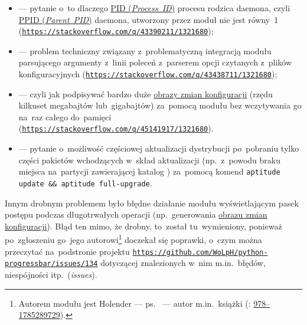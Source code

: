 \documentclass[thesis]{subfiles}
\begin{document}
\begin{itemize}
	\item {} --- pytanie o~to dlaczego \href{https://en.wikipedia.org/wiki/Process_identifier}{PID (\emph{Process~ID})} procesu rodzica daemona, czyli \href{http://wiki.linuxquestions.org/wiki/PPID}{PPID (\emph{Parent~PID})} daemona, utworzony przez moduł  nie jest równy~1 (\texttt{\url{https://stackoverflow.com/q/43390211/1321680}});
	\item {} --- problem techniczny związany z~problematyczną integracją modułu  parsującego argumenty z~linii poleceń z~parserem opcji czytanych z~plików konfiguracyjnych  (\texttt{\url{https://stackoverflow.com/q/43438711/1321680}});
	\item {} --- czyli jak podpisywać bardzo duże \hyperref[sec:obraz-zmian-konfiguracji]{obrazy zmian konfiguracji} (rzędu kilkuset megabajtów lub~gigabajtów) za~pomocą modułu  bez wczytywania go na~raz całego do~pamięci (\texttt{\url{https://stackoverflow.com/q/45141917/1321680}}).
	\item {} --- pytanie o~możliwość częściowej aktualizacji dystrybucji \debian{} po~pobraniu tylko części pakietów wchodzących w~skład aktualizacji (np.~z~powodu braku miejsca na~partycji zawierającej katalog ) za~pomocą komend \texttt{aptitude update \&\& aptitude full-upgrade}.
\end{itemize}

Innym drobnym problemem było błędne działanie modułu  wyświetlającym pasek postępu podczas długotrwałych operacji (np.~generowania \hyperref[sec:obraz-zmian-konfiguracji]{obrazu zmian konfiguracji}). Błąd ten mimo, że drobny, to~został tu~wymieniony, ponieważ po~zgłoszeniu go~jego autorowi\footnote{Autorem modułu  jest Holender ---  ps.~ --- autor m.in.~książki  (\isbn{}: \href{https://www.amazon.com/Mastering-Python-Rick-van-Hattem/dp/1785289721}{978--1785289729}).} doczekał się poprawki, o~czym można przeczytać na~podstronie projektu \texttt{\url{https://github.com/WoLpH/python-progressbar/issues/134}} dotyczącej znalezionych w~nim m.in.~błędów, niespójności itp.~(\emph{issues}).
\end{document}
